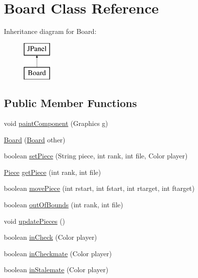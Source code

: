 \hypertarget{class_board}{\section{Board Class Reference}
\label{class_board}
}
Inheritance diagram for Board\-:\begin{figure}[H]
\begin{center}
\leavevmode
\includegraphics[height=2.000000cm]{class_board}
\end{center}
\end{figure}
\subsection*{Public Member Functions}
\begin{DoxyCompactItemize}
\item 
void \hyperlink{class_board_a05f7155d1fb7219fa0081ddbe68bdcad}{paint\-Component} (Graphics g)
\item 
\hyperlink{class_board_aebf754535b8a0916d83200f22e18b7d2}{Board} (\hyperlink{class_board}{Board} other)
\item 
boolean \hyperlink{class_board_ae21b41dcb5ceec5c4e65b78cf1a7a4c2}{set\-Piece} (String piece, int rank, int file, Color player)
\item 
\hyperlink{class_piece}{Piece} \hyperlink{class_board_aea0f59c98263beace6443cd735d6805c}{get\-Piece} (int rank, int file)
\item 
boolean \hyperlink{class_board_ae0e4510755f6ae9d6ee19d583a11a33b}{move\-Piece} (int rstart, int fstart, int rtarget, int ftarget)
\item 
boolean \hyperlink{class_board_af4ea6b5281f049d33eec4833fa370765}{out\-Of\-Bounds} (int rank, int file)
\item 
void \hyperlink{class_board_a6a1cca4fd5509abd8ade2bb0c609bd20}{update\-Pieces} ()
\item 
boolean \hyperlink{class_board_a0b0b1d68cf48422fa95a14ce744c5ea2}{in\-Check} (Color player)
\item 
boolean \hyperlink{class_board_ab7e8e624384c4f17b31a931fbfb7e25d}{in\-Checkmate} (Color player)
\item 
boolean \hyperlink{class_board_a734bff11809a6e4b62c26456bffb966e}{in\-Stalemate} (Color player)
\end{DoxyCompactItemize}


